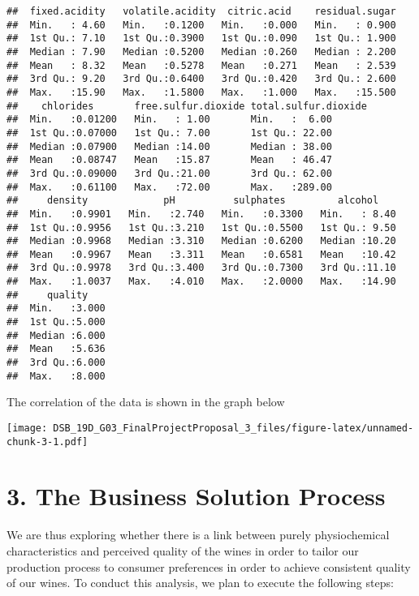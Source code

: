 \documentclass[]{article}
\begin{document}
\begin{verbatim}
##  fixed.acidity   volatile.acidity  citric.acid    residual.sugar  
##  Min.   : 4.60   Min.   :0.1200   Min.   :0.000   Min.   : 0.900  
##  1st Qu.: 7.10   1st Qu.:0.3900   1st Qu.:0.090   1st Qu.: 1.900  
##  Median : 7.90   Median :0.5200   Median :0.260   Median : 2.200  
##  Mean   : 8.32   Mean   :0.5278   Mean   :0.271   Mean   : 2.539  
##  3rd Qu.: 9.20   3rd Qu.:0.6400   3rd Qu.:0.420   3rd Qu.: 2.600  
##  Max.   :15.90   Max.   :1.5800   Max.   :1.000   Max.   :15.500  
##    chlorides       free.sulfur.dioxide total.sulfur.dioxide
##  Min.   :0.01200   Min.   : 1.00       Min.   :  6.00      
##  1st Qu.:0.07000   1st Qu.: 7.00       1st Qu.: 22.00      
##  Median :0.07900   Median :14.00       Median : 38.00      
##  Mean   :0.08747   Mean   :15.87       Mean   : 46.47      
##  3rd Qu.:0.09000   3rd Qu.:21.00       3rd Qu.: 62.00      
##  Max.   :0.61100   Max.   :72.00       Max.   :289.00      
##     density             pH          sulphates         alcohol     
##  Min.   :0.9901   Min.   :2.740   Min.   :0.3300   Min.   : 8.40  
##  1st Qu.:0.9956   1st Qu.:3.210   1st Qu.:0.5500   1st Qu.: 9.50  
##  Median :0.9968   Median :3.310   Median :0.6200   Median :10.20  
##  Mean   :0.9967   Mean   :3.311   Mean   :0.6581   Mean   :10.42  
##  3rd Qu.:0.9978   3rd Qu.:3.400   3rd Qu.:0.7300   3rd Qu.:11.10  
##  Max.   :1.0037   Max.   :4.010   Max.   :2.0000   Max.   :14.90  
##     quality     
##  Min.   :3.000  
##  1st Qu.:5.000  
##  Median :6.000  
##  Mean   :5.636  
##  3rd Qu.:6.000  
##  Max.   :8.000
\end{verbatim}

The correlation of the data is shown in the graph below

\texttt{[image: DSB\_19D\_G03\_FinalProjectProposal\_3\_files/figure-latex/unnamed-chunk-3-1.pdf]}

\clearpage

\hypertarget{the-business-solution-process}{%
\section{3. The Business Solution
Process}\label{the-business-solution-process}}

We are thus exploring whether there is a link between purely
physiochemical characteristics and perceived quality of the wines in
order to tailor our production process to consumer preferences in order
to achieve consistent quality of our wines. To conduct this analysis, we
plan to execute the following steps:
\end{document}
